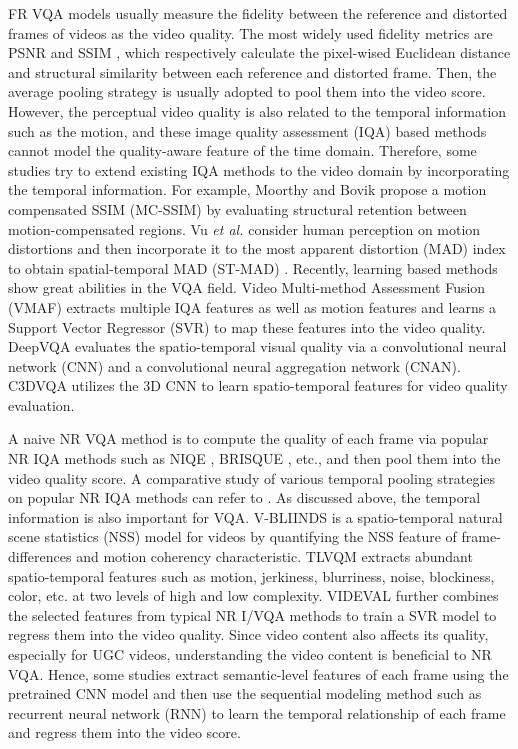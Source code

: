 \documentclass{article}
\begin{document}
FR VQA models usually measure the fidelity between the reference and distorted frames of videos as the video quality. The most widely used fidelity metrics are PSNR and SSIM \cite{wang2004image}, which respectively calculate the pixel-wised Euclidean distance and structural similarity between each reference and distorted frame. Then, the average pooling strategy is usually adopted to pool them into the video score.  However, the perceptual video quality is also related to the temporal information such as the motion, and these image quality assessment (IQA) \cite{zhai2020perceptual} based methods cannot model the quality-aware feature of the time domain. Therefore, some studies try to extend existing IQA methods to the video domain by incorporating the temporal information. For example, Moorthy and Bovik propose a motion compensated SSIM (MC-SSIM) \cite{moorthy2010efficient} by evaluating structural retention between motion-compensated regions. Vu \textit{et al.} consider human perception on motion distortions and then incorporate it to the most apparent distortion (MAD) index to obtain spatial-temporal MAD (ST-MAD) \cite{vu2011spatiotemporal}. Recently, learning based methods show great abilities in the VQA field. Video Multi-method Assessment Fusion (VMAF) extracts multiple IQA features as well as motion features and learns a Support Vector Regressor (SVR)  to map these features into the video quality. DeepVQA \cite{kim2018deep} evaluates the spatio-temporal visual quality via a convolutional neural network (CNN) and a convolutional neural aggregation network (CNAN). C3DVQA \cite{xu2020c3dvqa} utilizes the 3D CNN to learn spatio-temporal features for video quality evaluation. 


A naive NR VQA method is to compute the quality of each frame via popular NR IQA methods such as NIQE \cite{mittal2012making}, BRISQUE \cite{mittal2012no}, etc., and then pool them into the video quality score. A comparative study of various temporal pooling strategies on popular NR IQA methods can refer to \cite{tu2020comparative}. As discussed above, the temporal information is also important for VQA. V-BLIINDS \cite{saad2014blind} is a spatio-temporal natural scene statistics (NSS) model for videos by quantifying the NSS feature of frame-differences and motion coherency characteristic. TLVQM \cite{korhonen2019two} extracts abundant spatio-temporal features such as motion, jerkiness, blurriness, noise, blockiness, color, etc. at two levels of high and low complexity. VIDEVAL \cite{tu2021ugc} further combines the selected features from typical NR I/VQA methods to train a SVR model to regress them into the video quality. Since video content also affects its quality, especially for UGC videos, understanding the video content is beneficial to NR VQA. Hence, some studies \cite{li2019quality,chen2020rirnet} extract semantic-level features of each frame using the pretrained CNN model and then use the sequential modeling method such as recurrent neural network (RNN) to learn the temporal relationship of each frame and regress them into the video score.
\end{document}
